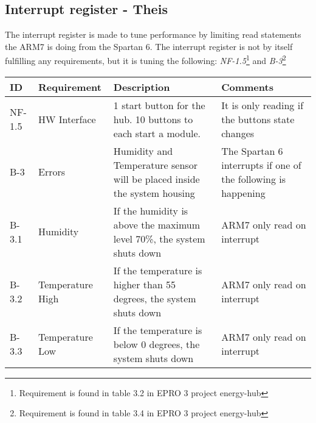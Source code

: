 %
%
%
%
%
%
%
%

\subsection{Interrupt register - Theis}
The interrupt register is made to tune performance by limiting read statements the ARM7 is doing from the Spartan 6. The interrupt register is not by itself fulfilling any requirements, but it is tuning the following: \textit{NF-1.5}\footnote{Requirement is found in table 3.2 in EPRO 3 project energy-hub} and \textit{B-3}\footnote{Requirement is found in table 3.4 in EPRO 3 project energy-hub}
\begin{table}[H]
\centering
	\begin{tabular}{|p{1.2cm}|p{2.3cm}|p{6cm}|p{6cm}|}
	\hline
	ID		& Requirement		& Description																& Comments\\\hline
	NF-1.5	& HW Interface		& 1 start button for the hub. 10 buttons to each start a module.			& It is only reading if the buttons state changes\\\hline
	B-3		& Errors			& Humidity and Temperature sensor will be placed inside the system housing	& The Spartan 6 interrupts if one of the following is happening\\\hline
	B-3.1	& Humidity			& If the humidity is above the maximum level 70\%, the system shuts down	& ARM7 only read on interrupt\\\hline
	B-3.2	& Temperature High	& If the temperature is higher than 55 degrees, the system shuts down		& ARM7 only read on interrupt\\\hline
	B-3.3	& Temperature Low	& If the temperature is below 0 degrees, the system shuts down				& ARM7 only read on interrupt\\\hline
	\end{tabular}
\end{table}
